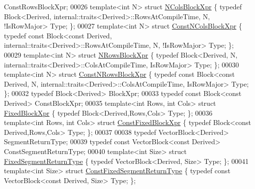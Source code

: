 \begin{DoxyCode}
      ConstRowsBlockXpr;
00026 \textcolor{keyword}{template}<\textcolor{keywordtype}{int} N> \textcolor{keyword}{struct }\hyperlink{struct_n_cols_block_xpr}{NColsBlockXpr} \{ \textcolor{keyword}{typedef} Block<Derived,
       internal::traits<Derived>::RowsAtCompileTime, N, !IsRowMajor> Type; \};
00027 \textcolor{keyword}{template}<\textcolor{keywordtype}{int} N> \textcolor{keyword}{struct }\hyperlink{struct_const_n_cols_block_xpr}{ConstNColsBlockXpr} \{ \textcolor{keyword}{typedef} \textcolor{keyword}{const} Block<const Derived,
       internal::traits<Derived>::RowsAtCompileTime, N, !IsRowMajor> Type; \};
00029 \textcolor{keyword}{template}<\textcolor{keywordtype}{int} N> \textcolor{keyword}{struct }\hyperlink{struct_n_rows_block_xpr}{NRowsBlockXpr} \{ \textcolor{keyword}{typedef} Block<Derived, N,
       internal::traits<Derived>::ColsAtCompileTime, IsRowMajor> Type; \};
00030 \textcolor{keyword}{template}<\textcolor{keywordtype}{int} N> \textcolor{keyword}{struct }\hyperlink{struct_const_n_rows_block_xpr}{ConstNRowsBlockXpr} \{ \textcolor{keyword}{typedef} \textcolor{keyword}{const} Block<const Derived, N,
       internal::traits<Derived>::ColsAtCompileTime, IsRowMajor> Type; \};
00032 \textcolor{keyword}{typedef} Block<Derived> BlockXpr;
00033 \textcolor{keyword}{typedef} \textcolor{keyword}{const} Block<const Derived> ConstBlockXpr;
00035 \textcolor{keyword}{template}<\textcolor{keywordtype}{int} Rows, \textcolor{keywordtype}{int} Cols> \textcolor{keyword}{struct }\hyperlink{struct_fixed_block_xpr}{FixedBlockXpr} \{ \textcolor{keyword}{typedef} Block<Derived,Rows,Cols> Type; \};
00036 \textcolor{keyword}{template}<\textcolor{keywordtype}{int} Rows, \textcolor{keywordtype}{int} Cols> \textcolor{keyword}{struct }\hyperlink{struct_const_fixed_block_xpr}{ConstFixedBlockXpr} \{ \textcolor{keyword}{typedef} Block<const
       Derived,Rows,Cols> Type; \};
00037 
00038 \textcolor{keyword}{typedef} VectorBlock<Derived> SegmentReturnType;
00039 \textcolor{keyword}{typedef} \textcolor{keyword}{const} VectorBlock<const Derived> ConstSegmentReturnType;
00040 \textcolor{keyword}{template}<\textcolor{keywordtype}{int} Size> \textcolor{keyword}{struct }\hyperlink{struct_fixed_segment_return_type}{FixedSegmentReturnType} \{ \textcolor{keyword}{typedef} VectorBlock<Derived, Size>
       Type; \};
00041 \textcolor{keyword}{template}<\textcolor{keywordtype}{int} Size> \textcolor{keyword}{struct }\hyperlink{struct_const_fixed_segment_return_type}{ConstFixedSegmentReturnType} \{ \textcolor{keyword}{typedef} \textcolor{keyword}{const} 
      VectorBlock<const Derived, Size> Type; \};

\end{DoxyCode}

